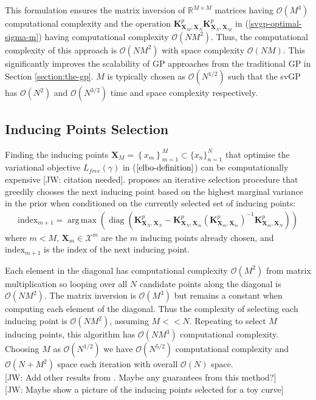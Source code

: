 \documentclass{article}
\newcommand{\jw}[1]{{\color{gray} [JW: #1]}}
\newcommand{\diag}{\operatorname{diag}}
\DeclareMathOperator*{\argmax}{arg\,max}
\numberwithin{equation}{section}
\begin{document}
This formulation ensures the matrix inversion of $\mathbb{R}^{M \times M}$ matrices having $\mathcal{O}\left(M^3\right)$ computational complexity and the operation $\mathbf{K}^p_{\mathbf{X}_M, \mathbf{X}_N} \mathbf{K}^p_{\mathbf{X}_N, \mathbf{X}_M} $ in (\ref{svgp-optimal-sigma-m}) having computational complexity $\mathcal{O}\left(NM^2\right)$. Thus, the computational complexity of this approach is $\mathcal{O}\left(NM^2\right)$ with space complexity $\mathcal{O}\left(NM\right)$. This significantly improves the scalability of GP approaches from the traditional GP in Section \ref{section:the-gp}. $M$ is typically chosen as $\mathcal{O}(N^{1/2})$ such that the svGP has $\mathcal{O}(N^{2})$ and $\mathcal{O}(N^{3/2})$ time and space complexity respectively.

\subsection{Inducing Points Selection}
Finding the inducing points $\mathbf{X}_M = \left\{x_m\right\}_{m=1}^{M} \subset \{x_n\}_{n=1}^{N}$ that optimise the variational objective $L_{free}(\gamma)$ in ($\ref{elbo-definition}$) can be computationally expensive \jw{citation needed}. \cite{burt2020convergence} proposes an iterative selection procedure that greedily chooses the next inducing point based on the highest marginal variance in the prior when conditioned on the currently selected set of inducing points:
\begin{align}
    \text{index}_{m+1} = \argmax \left(\diag \left(\mathbf{K}^p_{\mathbf{X}_N, \mathbf{X}_N} - \mathbf{K}^p_{\mathbf{X}_N, \mathbf{X}_{m}} \left(\mathbf{K}^p_{\mathbf{X}_{m}, \mathbf{X}_{m}}\right)^{-1}\mathbf{K}^p_{\mathbf{X}_{m}, \mathbf{X}_N}\right)\right)
\end{align}
where $m < M$, $\mathbf{X}_{m} \in \mathcal{X}^m$ are the $m$ inducing points already chosen, and $\text{index}_{m+1}$ is the index of the next inducing point.

Each element in the diagonal has computational complexity $\mathcal{O}(M^2)$ from matrix multiplication so looping over all $N$ candidate points along the diagonal is $\mathcal{O}(NM^2)$. The matrix inversion is $\mathcal{O}(M^3)$ but remains a constant when computing each element of the diagonal. Thus the complexity of selecting each inducing point is $\mathcal{O}(NM^2)$, assuming $M << N$. Repeating to select $M$ inducing points, this algorithm has $\mathcal{O}(NM^3)$ computational complexity. Choosing $M$ as $\mathcal{O}(N^{1/2})$ we have $\mathcal{O}(N^{5/2})$ computational complexity and $\mathcal{O}(N + M^2)$ space each iteration with overall $\mathcal{O}(N)$ space. 
\\\jw{Add other results from \cite{burt2020convergence}. Maybe any guarantees from this method?}
\\\jw{Maybe show a picture of the inducing points selected for a toy curve}
\end{document}
